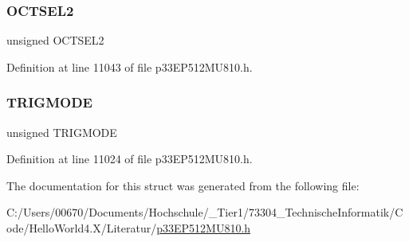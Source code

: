 \subsubsection{\texorpdfstring{O\+C\+T\+S\+E\+L2}{OCTSEL2}}
{\footnotesize\ttfamily unsigned O\+C\+T\+S\+E\+L2}



Definition at line 11043 of file p33\+E\+P512\+M\+U810.\+h.

\mbox{\label{structtag_o_c1_c_o_n1_b_i_t_s_a7a0057e0dca6e2663584b5b9e1da04c3}} 
\subsubsection{\texorpdfstring{T\+R\+I\+G\+M\+O\+DE}{TRIGMODE}}
{\footnotesize\ttfamily unsigned T\+R\+I\+G\+M\+O\+DE}



Definition at line 11024 of file p33\+E\+P512\+M\+U810.\+h.



The documentation for this struct was generated from the following file\+:\begin{DoxyCompactItemize}
\item 
C\+:/\+Users/00670/\+Documents/\+Hochschule/\+\_\+\+Tier1/73304\+\_\+\+Technische\+Informatik/\+Code/\+Hello\+World4.\+X/\+Literatur/\hyperlink{p33_e_p512_m_u810_8h}{p33\+E\+P512\+M\+U810.\+h}\end{DoxyCompactItemize}

